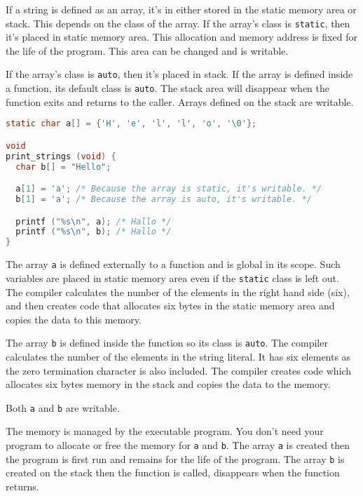 If a string is defined as an array, it's in either stored in the static
memory area or stack. This depends on the class of the array. If the
array's class is \passthrough{\lstinline!static!}, then it's placed in
static memory area. This allocation and memory address is fixed for the
life of the program. This area can be changed and is writable.

If the array's class is \passthrough{\lstinline!auto!}, then it's placed
in stack. If the array is defined inside a function, its default class
is \passthrough{\lstinline!auto!}. The stack area will disappear when
the function exits and returns to the caller. Arrays defined on the
stack are writable.

\begin{lstlisting}[language=C]
static char a[] = {'H', 'e', 'l', 'l', 'o', '\0'};

void
print_strings (void) {
  char b[] = "Hello";

  a[1] = 'a'; /* Because the array is static, it's writable. */
  b[1] = 'a'; /* Because the array is auto, it's writable. */

  printf ("%s\n", a); /* Hallo */
  printf ("%s\n", b); /* Hallo */
}
\end{lstlisting}

The array \passthrough{\lstinline!a!} is defined externally to a
function and is global in its scope. Such variables are placed in static
memory area even if the \passthrough{\lstinline!static!} class is left
out. The compiler calculates the number of the elements in the right
hand side (six), and then creates code that allocates six bytes in the
static memory area and copies the data to this memory.

The array \passthrough{\lstinline!b!} is defined inside the function so
its class is \passthrough{\lstinline!auto!}. The compiler calculates the
number of the elements in the string literal. It has six elements as the
zero termination character is also included. The compiler creates code
which allocates six bytes memory in the stack and copies the data to the
memory.

Both \passthrough{\lstinline!a!} and \passthrough{\lstinline!b!} are
writable.

The memory is managed by the executable program. You don't need your
program to allocate or free the memory for \passthrough{\lstinline!a!}
and \passthrough{\lstinline!b!}. The array \passthrough{\lstinline!a!}
is created then the program is first run and remains for the life of the
program. The array \passthrough{\lstinline!b!} is created on the stack
then the function is called, disappears when the function returns.

